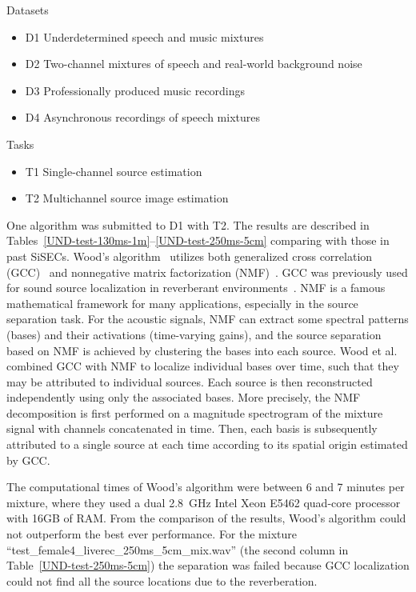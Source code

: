\documentclass{article}
\begin{document}
Datasets
\begin{itemize}
\item D1 Underdetermined speech and music mixtures
\item D2 Two-channel mixtures of speech and real-world background noise
\item D3 Professionally produced music recordings
\item D4 Asynchronous recordings of speech mixtures
\end{itemize}

Tasks
\begin{itemize}
\item T1 Single-channel source estimation
\item T2 Multichannel source image estimation
\end{itemize}

One algorithm was submitted to D1 with T2. The results are described in Tables~\ref{UND-test-130ms-1m}--\ref{UND-test-250ms-5cm} comparing 
with those in past SiSECs. Wood's algorithm~\cite{Wood} utilizes both generalized cross correlation (GCC)~\cite{GCC1} and nonnegative matrix 
factorization (NMF)~\cite{NMF}. GCC was previously used for sound source localization in reverberant environments~\cite{GCC2}. NMF is a 
famous mathematical framework for many applications, especially in the source separation task. For the acoustic signals, NMF can extract some 
spectral patterns (bases) and their activations (time-varying gains), and the source separation based on NMF is achieved by clustering the bases 
into each source. Wood et al. combined GCC with NMF to localize individual bases over time, such that they may be attributed to individual sources. 
Each source is then reconstructed independently using only the associated bases. More precisely, the NMF decomposition is first performed on a 
magnitude spectrogram of the mixture signal with channels concatenated in time. Then, each basis is subsequently attributed to a single source at 
each time according to its spatial origin estimated by GCC. 

The computational times of Wood's algorithm were between 6 and 7 minutes per mixture, where they used a dual 2.8~GHz Intel Xeon E5462 quad-core 
processor with 16GB of RAM. From the comparison of the results, Wood's algorithm could not outperform the best ever performance. For the mixture 
``test\_female4\_liverec\_250ms\_5cm\_mix.wav'' (the second column in Table~\ref{UND-test-250ms-5cm}) the separation was failed because GCC 
localization could not find all the source locations due to the reverberation.
\end{document}
